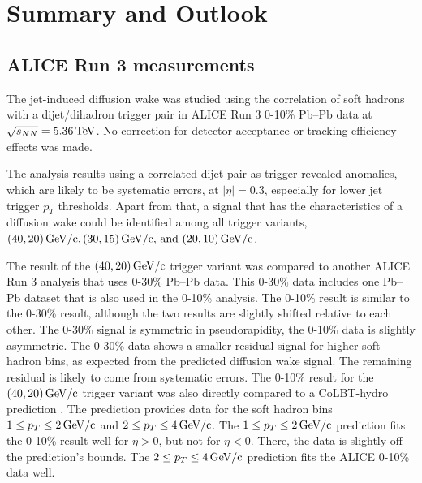 \documentclass[
  a4paper,
  12pt,
  oneside,
  parskip=half,
  listof=totoc,
  bibliography=totoc,
  DIV=12,
  numbers=noenddot,
  BA.tex
  ]{subfiles}
\begin{document}
\section{Summary and Outlook}

\subsection{ALICE Run 3 measurements}

The jet-induced diffusion wake was studied using the correlation of soft hadrons with a dijet/dihadron trigger pair in ALICE Run 3 0-10\% Pb--Pb data at $\sqrt{s_{NN}} = 5.36\bunit{TeV}$. No correction for detector acceptance or tracking efficiency effects was made.

The analysis results using a correlated dijet pair as trigger revealed anomalies, which are likely to be systematic errors, at $|\eta| = 0.3$, especially for lower jet trigger $p_T$ thresholds. Apart from that, a signal that has the characteristics of a diffusion wake could be identified among all trigger variants, \newline $(40,20)\bunit{GeV/c}, (30,15)\bunit{GeV/c} \text{, and } (20,10)\bunit{GeV/c}$.

The result of the $(40,20)\bunit{GeV/c}$ trigger variant was compared to another ALICE Run 3 analysis that uses 0-30\% Pb--Pb data. This 0-30\% data includes one Pb--Pb dataset that is also used in the 0-10\% analysis. The 0-10\% result is similar to the 0-30\% result, although the two results are slightly shifted relative to each other. The 0-30\% signal is symmetric in pseudorapidity, the 0-10\% data is slightly asymmetric. The 0-30\% data shows a smaller residual signal for higher soft hadron bins, as expected from the predicted diffusion wake signal. The remaining residual is likely to come from systematic errors. The 0-10\% result for the $(40,20)\bunit{GeV/c}$ trigger variant was also directly compared to a CoLBT-hydro prediction \cite{zhong_yang_colbt-hydro_2025}. The prediction provides data for the soft hadron bins $1 \leq p_T \leq 2 \bunit{GeV/c}$ and $2 \leq p_T \leq 4 \bunit{GeV/c}$. The $1 \leq p_T \leq 2 \bunit{GeV/c}$ prediction fits the 0-10\% result well for $\eta > 0$, but not for $\eta < 0$. There, the data is slightly off the prediction's bounds. The $2 \leq p_T \leq 4 \bunit{GeV/c}$ prediction fits the ALICE 0-10\% data well.
\end{document}
